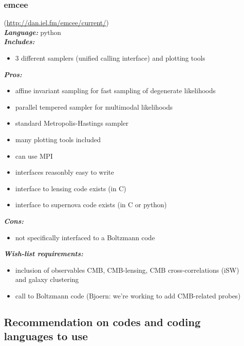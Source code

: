 \newpage
\subsubsection{emcee} 

(\url{http://dan.iel.fm/emcee/current/})\\

{\it \bf Language:} python\\

{\it \bf Includes:}
\begin{itemize}
 \item 3 different samplers (unified calling interface) and plotting tools
\end{itemize}

{\it \bf Pros:} 
\begin{itemize}
 \item affine invariant sampling for fast sampling of degenerate likelihoods
 \item parallel tempered sampler for multimodal likelihoods
 \item standard Metropolis-Hastings sampler
 \item many plotting tools included
 \item can use MPI
 \item interfaces reasonbly easy to write
 \item interface to lensing code exists (in C)
 \item interface to supernova code exists (in C or python)
 \end{itemize}

{\it \bf Cons:} 
\begin{itemize}
 \item not specifically interfaced to a Boltzmann code
\end{itemize}

{\it \bf Wish-list requirements: }
\begin{itemize}
 \item inclusion of observables CMB, CMB-lensing, CMB cross-correlations (iSW) and galaxy clustering
 \item call to Boltzmann code (Bjoern: we’re working to add CMB-related probes)
\end{itemize}

\newpage
\subsection{Recommendation on codes and coding languages to use}

